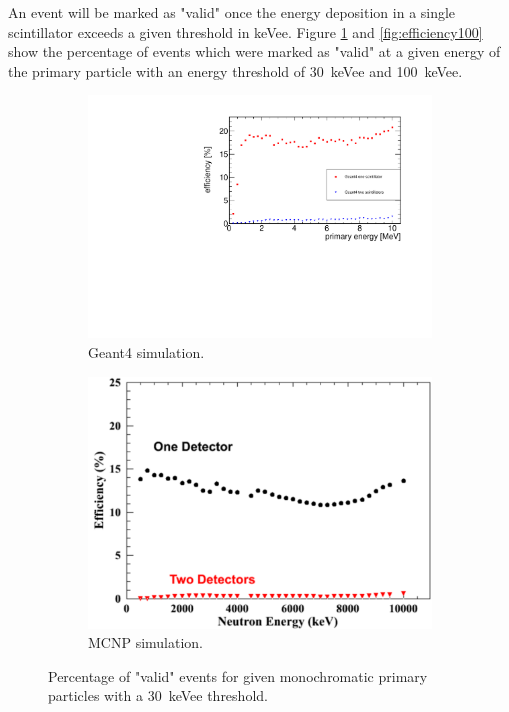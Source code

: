 \documentclass[12pt]{article}
\begin{document}
An event will be marked as "valid" once the energy deposition in a single scintillator exceeds a given threshold in keVee.  Figure \ref{fig:efficiency30} and \ref{fig:efficiency100} show the percentage of events which were marked as "valid" at a given energy of the primary particle with an energy threshold of \SI{30}{keVee} and \SI{100}{keVee}.

 \begin{figure}[H]
 	\begin{subfigure}[t]{0.49\textwidth}
 		\includegraphics[trim = 0cm 0cm 0cm 1.15cm, clip,width=\textwidth]{pics/efficiencyGeant30.pdf}
 		\caption{Geant4 simulation.}
 	\end{subfigure}
 	\begin{subfigure}[t]{0.49\textwidth}
 		\includegraphics[trim = 0cm 0cm 0cm 1.15cm, clip, width=\textwidth]{pics/efficiency_MCNP30.pdf}
 		\caption{MCNP simulation.}
 	\end{subfigure}
 	\caption{Percentage of "valid" events for given monochromatic primary particles with a \SI{30}{keVee} threshold.}
 	\label{fig:efficiency30}
 \end{figure}
\end{document}
